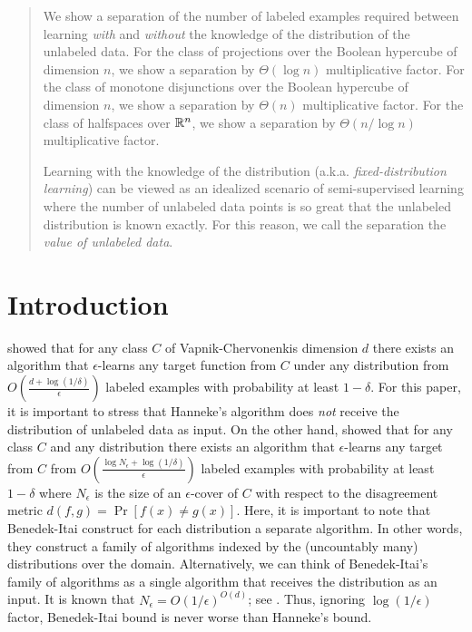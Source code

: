 \begin{abstract}
We show a separation of the number of labeled examples required between learning
\emph{with} and \emph{without} the knowledge of the distribution of the
unlabeled data. For the class of projections over the Boolean hypercube of
dimension $n$, we show a separation by $\Theta(\log n)$ multiplicative factor.
For the class of monotone disjunctions over the Boolean hypercube of dimension
$n$, we show a separation by $\Theta(n)$ multiplicative factor. For the class of
halfspaces over $\mathbb{R}^n$, we show a separation by  $\Theta(n/\log n)$
multiplicative factor.

Learning with the knowledge of the distribution (a.k.a. \emph{fixed-distribution
learning}) can be viewed as an idealized scenario of semi-supervised learning
where the number of unlabeled data points is so great that the unlabeled
distribution is known exactly. For this reason, we call the separation the
\emph{value of unlabeled data}.
\end{abstract}


\section{Introduction}

\cite{Hanneke-2016} showed that for any class $C$ of Vapnik-Chervonenkis
dimension $d$ there exists an algorithm that $\epsilon$-learns any target
function from $C$ under any distribution from $O\left(\frac{d +
\log(1/\delta)}{\epsilon}\right)$ labeled examples with probability at least
$1-\delta$. For this paper, it is important to stress that Hanneke's algorithm
does \emph{not} receive the distribution of unlabeled data as input. On the
other hand, \cite{Benedek-Itai-1991} showed that for any class $C$ and any
distribution there exists an algorithm that $\epsilon$-learns any target from
$C$ from $O \left( \frac{\log N_\epsilon + \log (1/\delta)}{\epsilon}\right)$
labeled examples with probability at least $1-\delta$ where $N_\epsilon$ is the
size of an $\epsilon$-cover of $C$ with respect to the disagreement metric
$d(f,g) = \Pr[f(x) \neq g(x)]$. Here, it is important to note that Benedek-Itai
construct for each distribution a separate algorithm. In other words, they
construct a family of algorithms indexed by the (uncountably many) distributions
over the domain. Alternatively, we can think of Benedek-Itai's family of
algorithms as a single algorithm that receives the distribution as an input. It
is known that $N_\epsilon = O(1/\epsilon)^{O(d)}$; see \cite{Dudley-1978}. Thus,
ignoring $\log(1/\epsilon)$ factor, Benedek-Itai bound is never worse than
Hanneke's bound.

